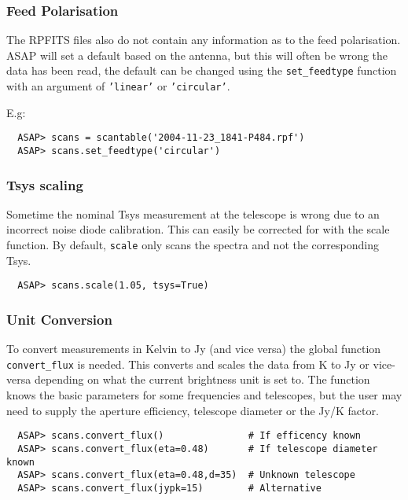 \documentclass[11pt]{article}
\newcommand{\cmd}[1]{{\tt #1}}
\begin{document}
\subsubsection{Feed Polarisation}

The RPFITS files also do not contain any
information as to the feed polarisation. ASAP will set a default based
on the antenna, but this will often be wrong the data has been read,
the default can be changed using the \cmd{set\_feedtype} function with
an argument of \cmd{'linear'} or \cmd{'circular'}.

E.g:

\begin{verbatim}
  ASAP> scans = scantable('2004-11-23_1841-P484.rpf')
  ASAP> scans.set_feedtype('circular')
\end{verbatim}

\subsubsection{Tsys scaling}

Sometime the nominal Tsys measurement at the
telescope is wrong due to an incorrect noise diode calibration. This
can easily be corrected for with the scale function. By default,
\cmd{scale} only scans the spectra and not the corresponding Tsys.

\begin{verbatim}
  ASAP> scans.scale(1.05, tsys=True)
\end{verbatim}

\subsubsection{Unit Conversion}

To convert measurements in Kelvin to Jy (and
vice versa) the global function \cmd{convert\_flux} is needed. This
converts and scales the data from K to Jy or vice-versa depending on
what the current brightness unit is set to. The function knows the
basic parameters for some frequencies and telescopes, but the user may
need to supply the aperture efficiency, telescope diameter or the Jy/K
factor.

\begin{verbatim}
  ASAP> scans.convert_flux()               # If efficency known
  ASAP> scans.convert_flux(eta=0.48)       # If telescope diameter known
  ASAP> scans.convert_flux(eta=0.48,d=35)  # Unknown telescope
  ASAP> scans.convert_flux(jypk=15)        # Alternative
\end{verbatim}
\end{document}
